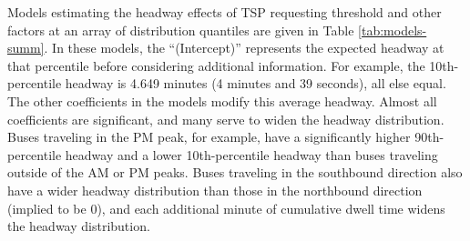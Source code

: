 \documentclass[3p, authoryear, review]{elsarticle} %
\begin{document}
Models estimating the headway effects of TSP requesting threshold and other factors
at an array of distribution quantiles are given in Table \ref{tab:models-summ}.
In these models, the ``(Intercept)'' represents the expected headway at that percentile
before considering additional information. For example, the 10th-percentile headway
is 4.649 minutes (4 minutes and 39 seconds), all else equal.
The other
coefficients in the models modify this average headway. Almost all coefficients are
significant, and many serve to widen the headway distribution.
Buses traveling in the PM peak, for example, have a significantly higher
90th-percentile headway and a lower 10th-percentile headway than buses
traveling outside of the AM or PM peaks. Buses traveling in the
southbound direction also have a wider headway distribution than those in the
northbound direction (implied to be \(0\)), and each additional minute of
cumulative dwell time widens the headway distribution.
\end{document}
